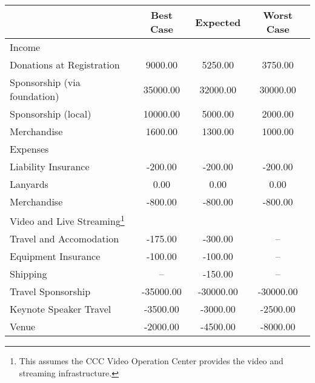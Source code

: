 \begin{tabularx}{\linewidth}{XSSS}
   & {Best Case} & {Expected} & {Worst Case} \\
  \hline\hline
Income \hspace*{1em}  & {} & {} & {}\\
\hspace*{1em} Donations at Registration  & 9000.00 & 5250.00 & 3750.00\\
\hspace*{1em} Sponsorship (via foundation)  & 35000.00 & 32000.00 & 30000.00\\
\hspace*{1em} Sponsorship (local)  & 10000.00 & 5000.00 & 2000.00\\
\hspace*{1em} Merchandise  & 1600.00 & 1300.00 & 1000.00\\[0.5ex]
Expenses \hspace*{1em}  & {} & {} & {}\\
\hspace*{1em} Liability Insurance  & -200.00 & -200.00 & -200.00\\
\hspace*{1em} Lanyards  & 0.00 & 0.00 & 0.00\\
\hspace*{1em} Merchandise  & -800.00 & -800.00 & -800.00\\
\hspace*{1em} Video and Live Streaming\footnote{This assumes the CCC Video Operation Center provides the video and streaming infrastructure.}  & {} & {} & {}\\
\hspace*{1em} \hspace*{1em} Travel and Accomodation & -175.00 & -300.00 & {–}\\
\hspace*{1em} \hspace*{1em} Equipment Insurance & -100.00 & -100.00 & {–}\\
\hspace*{1em} \hspace*{1em} Shipping & {–} & -150.00 & {–}\\
\hspace*{1em} Travel Sponsorship  & -35000.00 & -30000.00 & -30000.00\\
\hspace*{1em} Keynote Speaker Travel  & -3500.00 & -3000.00 & -2500.00\\
\hspace*{1em} Venue  & -2000.00 & -4500.00 & -8000.00\\

\end{tabularx}
